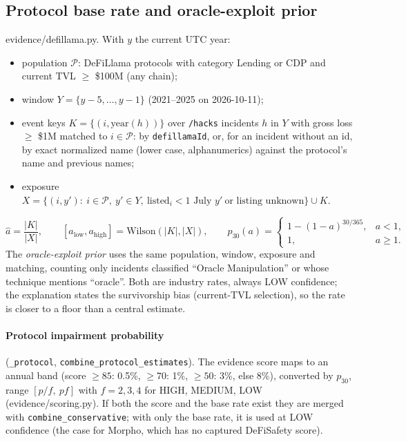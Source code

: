 \documentclass[11pt,a4paper]{article}
\newcommand{\code}[1]{\texttt{#1}}
\newcommand{\src}[1]{\textsf{\small #1}}
\begin{document}
\subsection{Protocol base rate and oracle-exploit prior}\label{sec:baserate}

\src{evidence/defillama.py}. With $y$ the current UTC year:
\begin{itemize}
\item population $\mathcal P$: DeFiLlama protocols with category Lending or CDP
  and current TVL $\geq$ \$100M (any chain);
\item window $Y=\{y-5,\dots,y-1\}$ (2021--2025 on 2026-10-11);
\item event keys $K=\{(i,\text{year}(h))\}$ over \code{/hacks} incidents $h$ in $Y$
  with gross loss $\geq$ \$1M matched to $i\in\mathcal P$: by
  \code{defillamaId}, or, for an incident without an id, by exact normalized name
  (lower case, alphanumerics) against the protocol's name and previous names;
\item exposure $X=\{(i,y'):\ i\in\mathcal P,\ y'\in Y,\ \text{listed}_i<\text{1 July }y'\ \text{or listing unknown}\}\cup K$.
\end{itemize}
\begin{equation}
\hat a=\frac{|K|}{|X|},\qquad [a_{\text{low}},a_{\text{high}}]=\text{Wilson}(|K|,|X|),\qquad
p_{30}(a)=\begin{cases}1-(1-a)^{30/365}, & a<1,\\ 1, & a\geq1.\end{cases}
\end{equation}
The \emph{oracle-exploit prior} uses the same population, window, exposure and
matching, counting only incidents classified ``Oracle Manipulation'' or whose
technique mentions ``oracle''. Both are industry rates, always LOW confidence; the
explanation states the survivorship bias (current-TVL selection), so the rate is
closer to a floor than a central estimate.

\paragraph{Protocol impairment probability} (\code{\_protocol},
\code{combine\_protocol\_estimates}). The evidence score maps to an annual band
(score $\geq85$: 0.5\%, $\geq70$: 1\%, $\geq50$: 3\%, else 8\%), converted by
$p_{30}$, range $[p/f,\ pf]$ with $f=2,3,4$ for HIGH, MEDIUM, LOW
(\src{evidence/scoring.py}). If both the score and the base rate exist they are
merged with \code{combine\_conservative}; with only the base rate, it is used at
LOW confidence (the case for Morpho, which has no captured DeFiSafety score).
\end{document}
